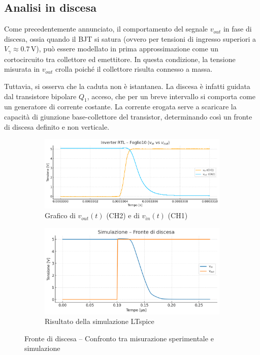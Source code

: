 \documentclass[a4paper,12pt]{article}
\begin{document}
\subsection{Analisi in discesa}
Come precedentemente annunciato, il comportamento del segnale \(v_{out}\) in fase di discesa, ossia quando il BJT si satura (ovvero per tensioni di ingresso superiori a \(V_{\gamma} \approx 0.7\,\mathrm{V}\)), può essere modellato in prima approssimazione come un cortocircuito tra collettore ed emettitore. In questa condizione, la tensione misurata in \(v_{out}\) crolla poiché il collettore risulta connesso a massa.

Tuttavia, si osserva che la caduta non è istantanea. La discesa è infatti guidata dal transistore bipolare \(Q_1\), acceso, che per un breve intervallo si comporta come un generatore di corrente costante. La corrente erogata serve a scaricare la capacità di giunzione base-collettore del transistor, determinando così un fronte di discesa definito e non verticale.

\begin{figure}[H] \label{fig: discesa}
  \centering
  \begin{subfigure}{0.9\textwidth}
    \includegraphics[width=\linewidth]{discesa.png}
    \caption{Grafico di \(v_{out}(t)\) (CH2) e di \(v_{in}(t)\) (CH1)}
  \end{subfigure}
  \hspace{0.05\textwidth}
  \begin{subfigure}{0.9\textwidth}
    \includegraphics[width=\linewidth]{discesa_sim2.png}
    \caption{Risultato della simulazione LTspice}
  \end{subfigure}
  \caption{Fronte di discesa – Confronto tra misurazione sperimentale e simulazione}
\end{figure}
\end{document}
